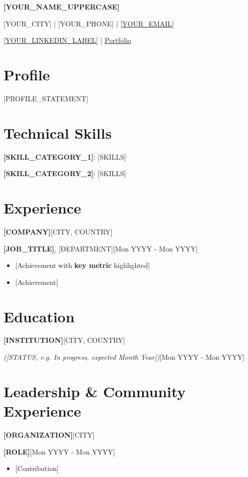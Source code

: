 \documentclass{article}
\newcommand{\org}[2]{\textbf{#1}\hfill #2\par}
\newcommand{\role}[2]{#1\hfill #2\par}
\begin{document}
\begin{center}
{\fontsize{18pt}{20pt}\selectfont\bfseries [YOUR_NAME_UPPERCASE]}\par
\vspace{2pt}
[YOUR_CITY] | [YOUR_PHONE] | \href{mailto:[YOUR_EMAIL]}{[YOUR_EMAIL]}\par
\href{[YOUR_LINKEDIN_URL]}{[YOUR_LINKEDIN_LABEL]} | \href{[YOUR_PORTFOLIO_URL]}{Portfolio}\par
\end{center}

\section{Profile}
[PROFILE_STATEMENT]

\section{Technical Skills}
\textbf{[SKILL_CATEGORY_1]}: [SKILLS]\par
\textbf{[SKILL_CATEGORY_2]}: [SKILLS]\par

\section{Experience}
\org{[COMPANY]}{[CITY, COUNTRY]}
\role{\textbf{[JOB_TITLE]}, [DEPARTMENT]}{[Mon YYYY - Mon YYYY]}
\begin{itemize}
    \item {[Achievement with \textbf{key metric} highlighted]}
    \item {[Achievement]}
\end{itemize}

\section{Education}
\org{[INSTITUTION]}{[CITY, COUNTRY]}
\role{[DEGREE] \textit{([STATUS, e.g. In progress, expected Month Year])}}{[Mon YYYY - Mon YYYY]}

\section{Leadership \& Community Experience}
\org{[ORGANIZATION]}{[CITY]}
\role{\textbf{[ROLE]}}{[Mon YYYY - Mon YYYY]}
\begin{itemize}
    \item {[Contribution]}
\end{itemize}
\end{document}
